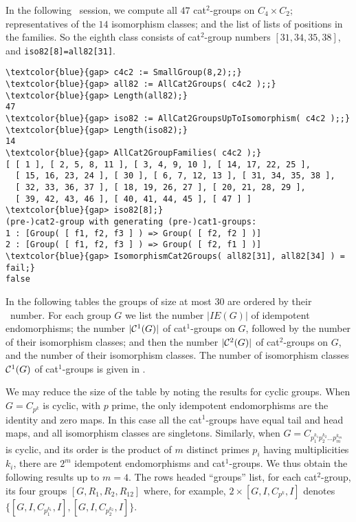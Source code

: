 \documentclass[a4paper,11pt]{article}
\theoremstyle{plain}
\theoremstyle{definition}
\begin{document}
In the following \GAP\ session, we compute all $47$ cat$^{2}$-groups on 
$C_{4} \times C_{2}$; representatives of the $14$ isomorphism classes; 
and the list of lists of positions in the families. 
So the eighth class consists of cat$^2$-group numbers $[31,34,35,38]$, 
and \texttt{iso82[8]=all82[31]}. 

\begin{Verbatim}[frame=single, fontsize=\small, commandchars=\\\{\}]
\textcolor{blue}{gap> c4c2 := SmallGroup(8,2);;}
\textcolor{blue}{gap> all82 := AllCat2Groups( c4c2 );;}
\textcolor{blue}{gap> Length(all82);}
47
\textcolor{blue}{gap> iso82 := AllCat2GroupsUpToIsomorphism( c4c2 );;}
\textcolor{blue}{gap> Length(iso82);}
14
\textcolor{blue}{gap> AllCat2GroupFamilies( c4c2 );}
[ [ 1 ], [ 2, 5, 8, 11 ], [ 3, 4, 9, 10 ], [ 14, 17, 22, 25 ], 
  [ 15, 16, 23, 24 ], [ 30 ], [ 6, 7, 12, 13 ], [ 31, 34, 35, 38 ], 
  [ 32, 33, 36, 37 ], [ 18, 19, 26, 27 ], [ 20, 21, 28, 29 ], 
  [ 39, 42, 43, 46 ], [ 40, 41, 44, 45 ], [ 47 ] ]
\textcolor{blue}{gap> iso82[8];}
(pre-)cat2-group with generating (pre-)cat1-groups:
1 : [Group( [ f1, f2, f3 ] ) => Group( [ f2, f2 ] )]
2 : [Group( [ f1, f2, f3 ] ) => Group( [ f2, f1 ] )]
\textcolor{blue}{gap> IsomorphismCat2Groups( all82[31], all82[34] ) = fail;}
false
\end{Verbatim}

In the following tables the groups of size at most $30$ are ordered by their
\GAP\ number. 
For each group $G$ we list the number $|IE(G)|$ of idempotent endomorphisms; 
the number $|\mathcal{C}^1(G)|$ of cat$^1$-groups on $G$, 
followed by the number of their isomorphism classes; 
and then the number $|\mathcal{C}^2(G)|$ of cat$^2$-groups on $G$, 
and the number of their isomorphism classes. 
The number of isomorphism classes $\mathcal{C}^1(G)$ of cat$^{1}$-groups 
is given in \cite{alp-wensley-ijac}. 

We may reduce the size of the table by noting the results for cyclic groups. 
When $G=C_{p^{k}}$ is cyclic, with $p$ prime, 
the only idempotent endomorphisms are the identity and zero maps. 
In this case all the cat$^1$-groups have equal tail and head maps, 
and all isomorphism classes are singletons. 
Similarly, when $G = C_{p_1^{k_1}p_2^{k_2} \ldots p_m^{k_m}}$ is cyclic, 
and its order is the product of $m$ distinct primes $p_i$ 
having multiplicities $k_i$, 
there are $2^m$ idempotent endomorphisms and cat$^1$-groups.  
We thus obtain the following results up to $m=4$. 
The rows headed ``groups'' list, for each cat$^2$-group, its four groups 
$[G,R_1,R_2,R_{12}]$ where, for example, $2 \times [G,I,C_{p^k},I]$ 
denotes $\{[G,I,C_{p_1^{k_1}},I],[G,I,C_{p_2^{k_2}},I]\}$. \\ 
\end{document}
